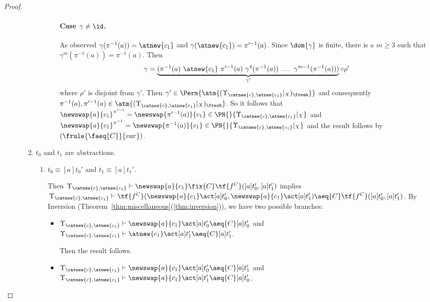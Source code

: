 \begin{proof}
\begin{description}
\begin{enumerate}
\begin{enumerate}
\begin{itemize}
            \paragraph*{Case $\gamma \neq \id$.}
            As observed $\gamma(\pi^{-1}(a)) = \atnew{c_1}$ and $\gamma(\atnew{c_1}) = \pi'^{-1}(a)$. Since $\dom{\gamma}$ is finite, there is a $m\geq 3$ such that $\gamma^m(\pi^{-1}(a)) = \pi^{-1}(a)$. Then
            \[
                \gamma = \underbrace{(\pi^{-1}(a) \ \atnew{c_1} \ \pi'^{-1}(a) \ \gamma^4(\pi^{-1}(a)) \ \ldots \ \gamma^{m-1}(\pi^{-1}(a)))}_{\gamma'}\circ \rho'
            \]
            where $\rho'$ is disjoint from $\gamma'$. Then $\gamma' \in \Perm{\atm{(\Upsilon_{\catnew{c},\atnew{c_1}}|_X)_{\fresh}}}$ and consequently $\pi^{-1}(a),\pi'^{-1}(a) \in \atm{(\Upsilon_{\catnew{c},\atnew{c_1}}|_X)_{\fresh}}$. So it follows that $\newswap{a}{c_1}^{\pi'^{-1}} = \newswap{\pi'^{-1}(a)}{c_1} \in \PN{}{\Upsilon_{\catnew{c},\atnew{c_1}}|_X}$ and  $\newswap{a}{c_1}^{\pi^{-1}} = \newswap{\pi^{-1}(a)}{c_1} \in \PN{}{\Upsilon_{\catnew{c},\atnew{c_1}}|_X}$ and the result follows by $(\frule{\faeq{C}}{var})$.
         \end{itemize}
        \end{enumerate}

        \item $t_0$ and $t_1$ are abstractions.
        \begin{enumerate}
            \item $t_0 \equiv [a]t_0'$ and $t_1 \equiv [a]t_1'$.

            Then $\Upsilon_{\catnew{c},\atnew{c_1}} \vdash \newswap{a}{c_1}\fix{C} \tf{f^C}([a]t_0',[a]t_1')$ implies $ \Upsilon_{\catnew{c},\atnew{c_1}} \vdash \tf{f^C}(\newswap{a}{c_1}\act[a]t_0',\newswap{a}{c_1}\act[a]t_1')\aeq{C} \tf{f^C}([a]t_0',[a]t_1')$. By Inversion (Theorem~\ref{thm:miscellaneous}(\ref{thm:inversion})), we have two possible branches:

        \begin{itemize}
            \item  $\Upsilon_{\catnew{c},\atnew{c_1}} \vdash \newswap{a}{c_1}\act [a]t_0'\aeq{C} [a]t_0'$ and $\Upsilon_{\catnew{c},\atnew{c_1}} \vdash \atnew{c_1}\act [a]t_1'\aeq{C} [a]t_1'$.

            Then the result follows.

            \item $\Upsilon_{\catnew{c},\atnew{c_1}} \vdash \newswap{a}{c_1}\act [a]t_0'\aeq{C} [a]t_1'$ and $\Upsilon_{\catnew{c},\atnew{c_1}} \vdash \newswap{a}{c_1}\act [a]t_1'\aeq{C} [a]t_0'$.


\end{itemize}
\end{enumerate}
\end{enumerate}
\end{description}
\end{proof}

